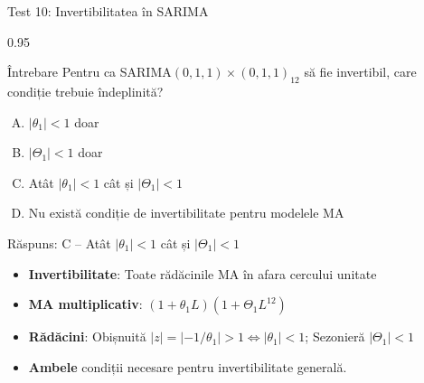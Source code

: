 \documentclass[9pt, aspectratio=169, t]{beamer}
\begin{document}
\begin{frame}{Test 10: Invertibilitatea în SARIMA}
    \begin{cminipage}{0.95\textwidth}
    \begin{alertblock}{Întrebare}
        Pentru ca SARIMA$(0,1,1) \times (0,1,1)_{12}$ să fie invertibil, care condiție trebuie îndeplinită?
    \end{alertblock}

    \vspace{0.3cm}

    \begin{enumerate}[A)]\setlength{\itemsep}{0pt}
        \item $|\theta_1| < 1$ doar
        \item $|\Theta_1| < 1$ doar
        \item Atât $|\theta_1| < 1$ cât și $|\Theta_1| < 1$
        \item Nu există condiție de invertibilitate pentru modelele MA
    \end{enumerate}

    \vspace{0.5cm}
    \pause
    \begin{exampleblock}{Răspuns: C -- Atât $|\theta_1| < 1$ cât și $|\Theta_1| < 1$}
        {\small
        \begin{itemize}\setlength{\itemsep}{0pt}
        \item \textbf{Invertibilitate}: Toate rădăcinile MA în afara cercului unitate
        \item \textbf{MA multiplicativ}: $(1+\theta_1 L)(1+\Theta_1 L^{12})$
        \item \textbf{Rădăcini}: Obișnuită $|z| = |{-1}/{\theta_1}| > 1 \Leftrightarrow |\theta_1| < 1$; Sezonieră $|\Theta_1| < 1$
        \item \textbf{Ambele} condiții necesare pentru invertibilitate generală.
        \end{itemize}
        }
    \end{exampleblock}
    \end{cminipage}
\end{frame}
\end{document}
